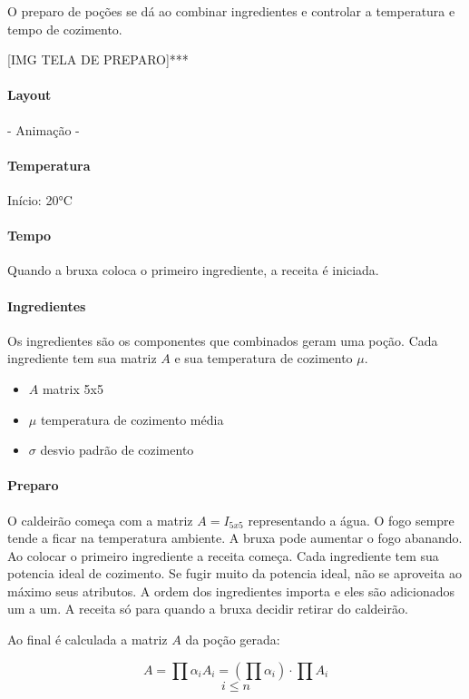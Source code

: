 \documentclass[12pt]{article}
\begin{document}
O preparo de poções se dá ao combinar ingredientes e controlar a temperatura e tempo de cozimento.


[IMG TELA DE PREPARO]***
\paragraph{Layout}
- Animação
- 

\paragraph{Temperatura}
Início: 20°C

\paragraph{Tempo}
Quando a bruxa coloca o primeiro ingrediente, a receita é iniciada.

\paragraph{Ingredientes}

Os ingredientes são os componentes que combinados geram uma poção. 
Cada ingrediente tem sua matriz $A$ e sua temperatura de cozimento $\mu $.

\begin{itemize}
    \item \(A\) matrix 5x5
    \item \(\mu\) temperatura de cozimento média
    \item \(\sigma\) desvio padrão de cozimento
\end{itemize}

\paragraph{Preparo}

O caldeirão começa com a matriz $A=I_{5x5}$ representando a água.
O fogo sempre tende a ficar na temperatura ambiente.
A bruxa pode aumentar o fogo abanando.
Ao colocar o primeiro ingrediente a receita começa.
Cada ingrediente tem sua potencia ideal de cozimento.
Se fugir muito da potencia ideal, não se aproveita ao máximo seus atributos. 
A ordem dos ingredientes importa e eles são adicionados um a um.
A receita só para quando a bruxa decidir retirar do caldeirão.


Ao final é calculada a matriz $A$ da poção gerada:

\[A = \prod{\alpha_i A_i} = (\prod{\alpha_i}) \cdot \prod{A_i} \]
\[i \leq n \]
\end{document}
